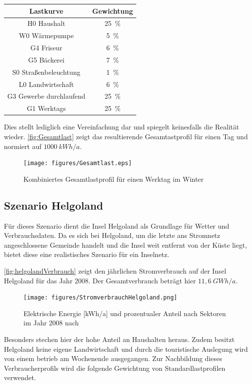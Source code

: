 \begin{center}
	\begin{tabular}[htpb]{c|c}
		\textbf{Lastkurve} & \textbf{Gewichtung} \\
		\hline
		H0 Haushalt & 25~\% \\
		W0 Wärmepumpe & 5~\% \\
		G4 Friseur & 6~\% \\
		G5 Bäckerei & 7~\% \\
		S0 Straßenbeleuchtung & 1~\% \\
		L0 Landwirtschaft & 6~\% \\
		G3 Gewerbe durchlaufend & 25~\% \\
		G1 Werktags & 25~\% 
	\end{tabular}
\end{center}

Dies stellt lediglich eine Vereinfachung dar und spiegelt keinesfalls die Realität wieder. \autoref{fig:Gesamtlast} zeigt das resultierende Gesamtastprofil für einen Tag und normiert auf $1000~kWh/a$.

\begin{figure}[H]
	\centering
	\texttt{[image: figures/Gesamtlast.eps]}
	\caption{Kombiniertes Gesamtlastprofil für einen Werktag im Winter}
	\label{fig:Gesamtlast}
\end{figure}

\subsection{Szenario Helgoland}

Für dieses Szenario dient die Insel Helgoland als Grundlage für Wetter und Verbrauchsdaten. Da es sich bei Helgoland, um die letzte ans Stromnetz angeschlossene Gemeinde handelt und die Insel weit entfernt von der Küste liegt, bietet diese eine realistisches Szenario für ein Inselnetz.

\autoref{fig:helgolandVerbrauch} zeigt den jährlichen Stromverbrauch auf der Insel Helgoland für das Jahr 2008. Der Gesamtverbrauch beträgt hier $11,6~GWh/a$.

\begin{figure}[H]
	\centering
	\texttt{[image: figures/StromverbrauchHelgoland.png]}
	\caption{Elektrische Energie [kWh/a] und prozentualer Anteil nach Sektoren im Jahr 2008 nach \cite{Helgoland}}
	\label{fig:helgolandVerbrauch}
\end{figure}

Besonders stechen hier der hohe Anteil an Haushalten heraus. Zudem besitzt Helgoland keine eigene Landwirtschaft und durch die touristische Auslegung wird von einem betrieb am Wochenende ausgegangen. Zur Nachbildung dieses Verbraucherprofils wird die folgende Gewichtung von Standardlastprofilen verwendet.

